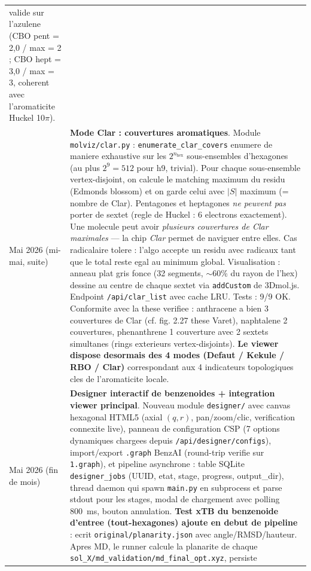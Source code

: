 \begin{center}
\begin{tabular}{lp{11cm}}
    valide sur l'azulene (CBO pent = 2,0 / max = 2 ; CBO hept = 3,0
    / max = 3, coherent avec l'aromaticite Huckel 10\(\pi\)). \\
  Mai 2026 (mi-mai, suite) &
    \textbf{Mode Clar : couvertures aromatiques}. Module
    \texttt{molviz/clar.py} : \texttt{enumerate\_clar\_covers} enumere
    de maniere exhaustive sur les $2^{n_{\text{hex}}}$ sous-ensembles
    d'hexagones (au plus $2^9 = 512$ pour h9, trivial). Pour chaque
    sous-ensemble vertex-disjoint, on calcule le matching maximum du
    residu (Edmonds blossom) et on garde celui avec $|S|$ maximum
    (= nombre de Clar). Pentagones et heptagones \emph{ne peuvent pas}
    porter de sextet (regle de Huckel : 6 electrons exactement). Une
    molecule peut avoir \emph{plusieurs couvertures de Clar maximales}
    --- la chip \emph{Clar} permet de naviguer entre elles. Cas
    radicalaire tolere : l'algo accepte un residu avec radicaux tant
    que le total reste egal au minimum global. Visualisation : anneau
    plat gris fonce (32 segments, $\sim$60\% du rayon de l'hex)
    dessine au centre de chaque sextet via \texttt{addCustom} de
    3Dmol.js. Endpoint \texttt{/api/clar\_list} avec cache LRU.
    Tests : 9/9 OK. Conformite avec la these verifiee : anthracene a
    bien 3 couvertures de Clar (cf. fig. 2.27 these Varet),
    naphtalene 2 couvertures, phenanthrene 1 couverture avec 2
    sextets simultanes (rings exterieurs vertex-disjoints).
    \textbf{Le viewer dispose desormais des 4 modes (Defaut / Kekule /
    RBO / Clar)} correspondant aux 4 indicateurs topologiques cles de
    l'aromaticite locale. \\
  Mai 2026 (fin de mois) &
    \textbf{Designer interactif de benzenoides + integration viewer
    principal}. Nouveau module \texttt{designer/} avec canvas hexagonal
    HTML5 (axial $(q, r)$, pan/zoom/clic, verification connexite live),
    panneau de configuration CSP (7 options dynamiques chargees depuis
    \texttt{/api/designer/configs}), import/export \texttt{.graph}
    BenzAI (round-trip verifie sur \texttt{1.graph}), et pipeline
    asynchrone : table SQLite \texttt{designer\_jobs} (UUID, etat,
    stage, progress, output\_dir), thread daemon qui spawn
    \texttt{main.py} en subprocess et parse stdout pour les stages,
    modal de chargement avec polling 800~ms, bouton annulation.
    \textbf{Test xTB du benzenoide d'entree (tout-hexagones) ajoute en
    debut de pipeline} : ecrit \texttt{original/planarity.json} avec
    angle/RMSD/hauteur. Apres MD, le runner calcule la planarite de
    chaque \texttt{sol\_X/md\_validation/md\_final\_opt.xyz}, persiste

\end{tabular}
\end{center}
